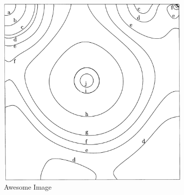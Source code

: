 \begin{figure}[p]
    \centering
    \includegraphics[width=0.85\textwidth]{Images/pressure.png}
    \caption{Awesome Image}
    \label{fig:awesome_image}
\end{figure}
